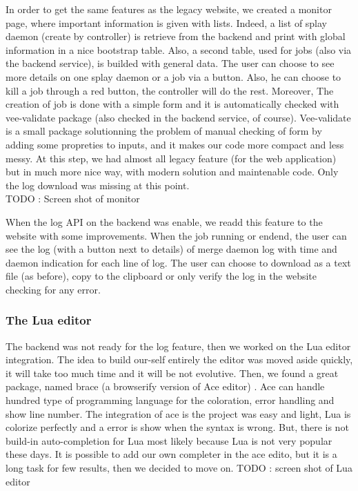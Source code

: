 \documentclass{eplmastersthesis}
\begin{document}
        In order to get the same features as the legacy website, we created a
        monitor page, where important information is given with lists. Indeed,
        a list of splay daemon (create by controller) is retrieve from the
        backend and print with global information in a nice bootstrap table.
        Also, a second table, used for jobs (also via the backend service), is
        builded with general data. The user can choose to see more details on
        one splay daemon or a job via a button. Also, he can choose to kill a
        job through a red button, the controller will do the rest. Moreover, The creation of job is done
        with a simple form and it is automatically checked with vee-validate
        package \cite{VeeValidate} (also checked in the backend service, of
        course). Vee-validate is a small package solutionning the problem of
        manual checking of form by adding some propreties to inputs, and it
        makes our code more compact and less messy. At this step, we had
        almost all legacy feature (for the web application) but in much more
        nice way, with modern solution and maintenable code. Only the log
        download was missing at this point. \\
        {\color{red} TODO : Screen shot of monitor}

        When the log API on the backend was enable, we readd this feature to the website with some
        improvements. When the job running or endend, the user can see the log (with a button next to details)
        of merge daemon log with time and daemon indication for each line of log. The user can choose to
        download as a text file (as before), copy to the clipboard or only verify the log in
        the website checking for any error. \\

        \subsubsection{The Lua editor}
        The backend was not ready for the log feature, then we worked on the Lua editor
        integration. The idea to build our-self entirely the editor was moved aside quickly,
        it will take too much time and it will be not evolutive. Then, we found a
        great package, named brace (a browserify version of Ace editor) \cite{Ace}. Ace
        can handle hundred type of programming language for the coloration, error handling and
        show line number. The integration of ace is the project was easy and light, Lua is
        colorize perfectly and a error is show when the syntax is wrong. But, there is not
        build-in auto-completion for Lua most likely because Lua is not very popular these days.
        It is possible to add our own completer in the ace edito, but it is a long task
        for few results, then we decided to move on.
        {\color{red} TODO : screen shot of Lua editor}
\end{document}
